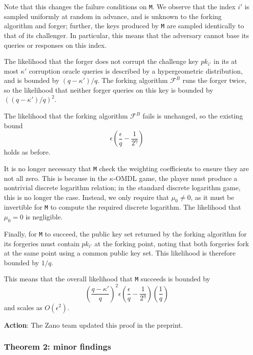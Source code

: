 \documentclass{article}
\begin{document}
Note that this changes the failure conditions on \texttt{M}.
We observe that the index $i'$ is sampled uniformly at random in advance, and is unknown to the forking algorithm and forger; further, the keys produced by \texttt{M} are sampled identically to that of its challenger.
In particular, this means that the adversary cannot base its queries or responses on this index.

The likelihood that the forger does not corrupt the challenge key $pk_{i'}$ in its at most $\kappa'$ corruption oracle queries is described by a hypergeometric distribution, and is bounded by $(q-\kappa')/q$.
The forking algorithm $\mathcal{F}^B$ runs the forger twice, so the likelihood that neither forger queries on this key is bounded by $((q-\kappa')/q)^2$.

The likelihood that the forking algorithm $\mathcal{F}^B$ fails is unchanged, so the existing bound $$\epsilon \left( \frac{\epsilon}{q} - \frac{1}{2^\eta} \right)$$ holds as before.

It is no longer necessary that \texttt{M} check the weighting coefficients to ensure they are not all zero.
This is because in the $\kappa$-OMDL game, the player must produce a nontrivial discrete logarithm relation; in the standard discrete logarithm game, this is no longer the case.
Instead, we only require that $\mu_0 \neq 0$, as it must be invertible for \texttt{M} to compute the required discrete logarithm.
The likelihood that $\mu_0 = 0$ is negligible.

Finally, for \texttt{M} to succeed, the public key set returned by the forking algorithm for its forgeries must contain $pk_{i'}$ at the forking point, noting that both forgeries fork at the same point using a common public key set.
This likelihood is therefore bounded by $1/q$.

This means that the overall likelihood that \texttt{M} succeeds is bounded by $$\left( \frac{q-\kappa'}{q} \right)^2 \epsilon \left( \frac{\epsilon}{q} - \frac{1}{2^\eta} \right) \left( \frac{1}{q} \right)$$ and scales as $O(\epsilon^2)$.

\textbf{Action}: The Zano team updated this proof in the preprint.


\subsubsection{Theorem 2: minor findings}
\end{document}

